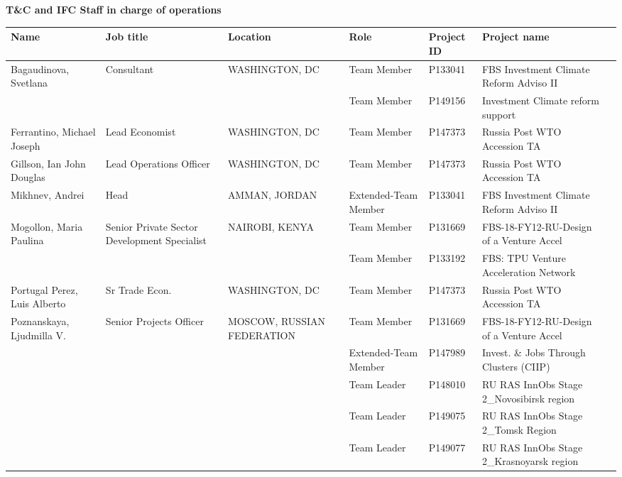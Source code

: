 \documentclass{article}\usepackage[]{graphicx}\usepackage[]{color}
\begin{document}
\begin{minipage}[b]{0.99\textwidth}
  \vspace*{1cm}
  \raggedright{\color{white!30!blue} \textbf{\large T\&C and IFC Staff in charge of operations}}
  \vspace*{0.5cm}
     
{\footnotesize
\begin{longtable}{>{\raggedright}p{1.4in}>{\raggedright}p{1in}>{\raggedright}p{1in}>{\raggedright}p{1in}l>{\raggedright}p{1.5in}l}
 Name & Job title & Location & Role & Project ID & Project name &  \\ 
  \hline
Bagaudinova, Svetlana & Consultant & WASHINGTON, DC & Team Member & P133041 & FBS Investment Climate Reform Adviso II &  \\ 
   &  &  & Team Member & P149156 & Investment Climate reform support &  \\ 
  Ferrantino, Michael Joseph & Lead Economist & WASHINGTON, DC & Team Member & P147373 & Russia Post WTO Accession TA &  \\ 
  Gillson, Ian John Douglas & Lead Operations Officer & WASHINGTON, DC & Team Member & P147373 & Russia Post WTO Accession TA &  \\ 
  Mikhnev, Andrei & Head & AMMAN, JORDAN & Extended-Team Member & P133041 & FBS Investment Climate Reform Adviso II &  \\ 
  Mogollon, Maria Paulina & Senior Private Sector Development Specialist & NAIROBI, KENYA & Team Member & P131669 & FBS-18-FY12-RU-Design of a Venture Accel &  \\ 
   &  &  & Team Member & P133192 & FBS: TPU Venture Acceleration Network &  \\ 
  Portugal Perez, Luis Alberto & Sr Trade Econ. & WASHINGTON, DC & Team Member & P147373 & Russia Post WTO Accession TA &  \\ 
  Poznanskaya, Ljudmilla V. & Senior Projects Officer & MOSCOW, RUSSIAN FEDERATION & Team Member & P131669 & FBS-18-FY12-RU-Design of a Venture Accel &  \\ 
   &  &  & Extended-Team Member & P147989 & Invest. \& Jobs Through Clusters (CIIP) &  \\ 
   &  &  & Team Leader & P148010 & RU RAS InnObs Stage 2\_Novosibirsk region &  \\ 
   &  &  & Team Leader & P149075 & RU RAS InnObs Stage 2\_Tomsk Region &  \\ 
   &  &  & Team Leader & P149077 & RU RAS InnObs Stage 2\_Krasnoyarsk region &  \\ 

\end{longtable}}
\end{minipage}
\end{document}
